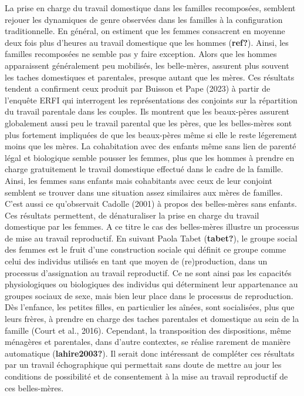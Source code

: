 \documentclass[
  12pt,
]{book}
\begin{document}
La prise en charge du travail domestique dans les familles recomposées,
semblent rejouer les dynamiques de genre observées dans les familles à
la configuration traditionnelle. En général, on estiment que les femmes
consacrent en moyenne deux fois plus d'heures au travail domestique que
les hommes (\textbf{ref?}). Ainsi, les familles recomposées ne semble
pas y faire exception. Alors que les hommes apparaissent généralement
peu mobilisés, les belle-mères, assurent plus souvent les taches
domestiques et parentales, presque autant que les mères. Ces résultats
tendent a confirment ceux produit par Buisson et Pape (2023) à partir de
l'enquête ERFI qui interrogent les représentations des conjoints sur la
répartition du travail parentale dans les couples. Ils montrent que les
beaux-pères assurent globalement aussi peu le travail parental que les
pères, que les belles-mères sont plus fortement impliquées de que les
beaux-pères même si elle le reste légerement moins que les mères. La
cohabitation avec des enfants même sans lien de parenté légal et
biologique semble pousser les femmes, plus que les hommes à prendre en
charge gratuitement le travail domestique effectué dans le cadre de la
famille. Ainsi, les femmes sans enfants mais cohabitants avec ceux de
leur conjoint semblent se trouver dans une situation assez similaires
aux mères de familles. C'est aussi ce qu'observait Cadolle (2001) à
propos des belles-mères sans enfants. Ces résultats permettent, de
dénaturaliser la prise en charge du travail domestique par les femmes. A
ce titre le cas des belles-mères illustre un processus de mise au
travail reproductif. En suivant Paola Tabet (\textbf{tabet?}), le groupe
social des femmes est le fruit d'une construction sociale qui définit ce
groupe comme celui des individus utilisés en tant que moyen de
(re)production, dans un processus d'assignation au travail reproductif.
Ce ne sont ainsi pas les capacités physiologiques ou biologiques des
individus qui déterminent leur appartenance au groupes sociaux de sexe,
mais bien leur place dans le processus de reproduction. Dès l'enfance,
les petites filles, en particulier les aînées, sont socialisées, plus
que leurs frères, à prendre en charge des taches parentales et
domestique au sein de la famille (Court et al., 2016). Cependant, la
transposition des dispositions, même ménagères et parentales, dans
d'autre contextes, se réalise rarement de manière automatique
(\textbf{lahire2003?}). Il serait donc intéressant de compléter ces
résultats par un travail échographique qui permettait sans doute de
mettre au jour les conditions de possibilité et de consentement à la
mise au travail reproductif de ces belles-mères.
\end{document}
